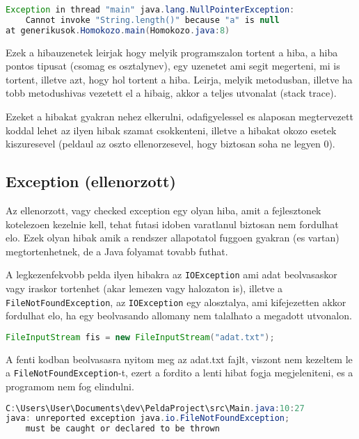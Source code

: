 \documentclass{article}
\let\l\lstinline
\begin{document}
\begin{lstlisting}[language=Java, caption=NullPointerException]
Exception in thread "main" java.lang.NullPointerException:
    Cannot invoke "String.length()" because "a" is null
at generikusok.Homokozo.main(Homokozo.java:8)
\end{lstlisting}

Ezek a hibauzenetek leirjak hogy melyik programszalon tortent a hiba, a hiba pontos tipusat (csomag es osztalynev), egy uzenetet ami segit megerteni, mi is tortent, illetve azt, hogy hol tortent a hiba. Leirja, melyik metodusban, illetve ha tobb metodushivas vezetett el a hibaig, akkor a teljes utvonalat (stack trace).

Ezeket a hibakat gyakran nehez elkerulni, odafigyelessel es alaposan megtervezett koddal lehet az ilyen hibak szamat csokkenteni, illetve a hibakat okozo esetek kiszuresevel (peldaul az oszto ellenorzesevel, hogy biztosan soha ne legyen 0).

\newpage

\subsection{Exception (ellenorzott)}

Az ellenorzott, vagy checked exception egy olyan hiba, amit a fejlesztonek kotelezoen kezelnie kell, tehat futasi idoben varatlanul biztosan nem fordulhat elo. Ezek olyan hibak amik a rendszer allapotatol fuggoen gyakran (es vartan) megtortenhetnek, de a Java folyamat tovabb futhat.

A legkezenfekvobb pelda ilyen hibakra az \l{IOException} ami adat beolvasaskor vagy iraskor tortenhet (akar lemezen vagy halozaton is), illetve a \l{FileNotFoundException}, az \l{IOException} egy alosztalya, ami kifejezetten akkor fordulhat elo, ha egy beolvasando allomany nem talalhato a megadott utvonalon.

\begin{lstlisting}[language=Java, caption=Kezeletlen FileNotFoundException]
FileInputStream fis = new FileInputStream("adat.txt");
\end{lstlisting}

A fenti kodban beolvasasra nyitom meg az adat.txt fajlt, viszont nem kezeltem le a \l{FileNotFoundException}-t, ezert a fordito a lenti hibat fogja megjeleniteni, es a programom nem fog elindulni.

\begin{lstlisting}[language=Java, caption=Kezeletlen FileNotFoundException]
C:\Users\User\Documents\dev\PeldaProject\src\Main.java:10:27
java: unreported exception java.io.FileNotFoundException;
    must be caught or declared to be thrown
\end{lstlisting}
\end{document}
